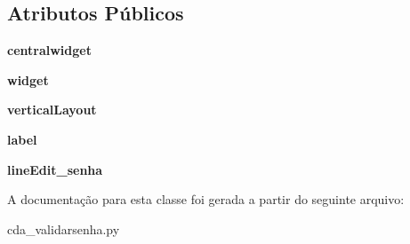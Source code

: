 \subsection*{\-Atributos \-Públicos}
\begin{DoxyCompactItemize}
\item 
\hypertarget{classcda__validarsenha_1_1Ui__Adm__Senha__Window_a1603f8f04bcc3fd1feb7ef77789fec78}{{\bfseries centralwidget}}\label{classcda__validarsenha_1_1Ui__Adm__Senha__Window_a1603f8f04bcc3fd1feb7ef77789fec78}

\item 
\hypertarget{classcda__validarsenha_1_1Ui__Adm__Senha__Window_a2adf288dfe190c4dbefef4a049a99e35}{{\bfseries widget}}\label{classcda__validarsenha_1_1Ui__Adm__Senha__Window_a2adf288dfe190c4dbefef4a049a99e35}

\item 
\hypertarget{classcda__validarsenha_1_1Ui__Adm__Senha__Window_a1f0045ebafa72a61e122ed8856816355}{{\bfseries vertical\-Layout}}\label{classcda__validarsenha_1_1Ui__Adm__Senha__Window_a1f0045ebafa72a61e122ed8856816355}

\item 
\hypertarget{classcda__validarsenha_1_1Ui__Adm__Senha__Window_a43b77ac7fb5662ad2d6b655880961a90}{{\bfseries label}}\label{classcda__validarsenha_1_1Ui__Adm__Senha__Window_a43b77ac7fb5662ad2d6b655880961a90}

\item 
\hypertarget{classcda__validarsenha_1_1Ui__Adm__Senha__Window_a20a4a91170c95bd4ba19600a6253ab63}{{\bfseries line\-Edit\-\_\-senha}}\label{classcda__validarsenha_1_1Ui__Adm__Senha__Window_a20a4a91170c95bd4ba19600a6253ab63}

\end{DoxyCompactItemize}


\-A documentação para esta classe foi gerada a partir do seguinte arquivo\-:\begin{DoxyCompactItemize}
\item 
cda\-\_\-validarsenha.\-py\end{DoxyCompactItemize}
